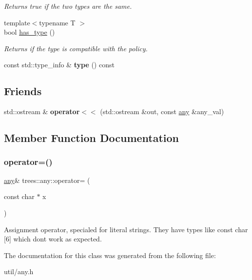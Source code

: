 \begin{DoxyCompactItemize}
\begin{DoxyCompactList}\small\item\em Returns true if the two types are the same. \end{DoxyCompactList}\item 
\mbox{\label{classtrees_1_1any_af176250c5b4a965705c28b3fe4d150ad}} 
{\footnotesize template$<$typename T $>$ }\\bool \hyperlink{classtrees_1_1any_af176250c5b4a965705c28b3fe4d150ad}{has\+\_\+type} ()
\begin{DoxyCompactList}\small\item\em Returns if the type is compatible with the policy. \end{DoxyCompactList}\item 
\mbox{\label{classtrees_1_1any_a12c9cf25286af6afcb4891d8bbd5b2fa}} 
const std\+::type\+\_\+info \& {\bfseries type} () const
\end{DoxyCompactItemize}
\subsection*{Friends}
\begin{DoxyCompactItemize}
\item 
\mbox{\label{classtrees_1_1any_a2987b17b8a128cbefb105ed12f5b8f92}} 
std\+::ostream \& {\bfseries operator$<$$<$} (std\+::ostream \&out, const \hyperlink{classtrees_1_1any}{any} \&any\+\_\+val)
\end{DoxyCompactItemize}


\subsection{Member Function Documentation}
\mbox{\label{classtrees_1_1any_a0368d90cf359207445c6cec185933ea1}} 
\subsubsection{\texorpdfstring{operator=()}{operator=()}}
{\footnotesize\ttfamily \hyperlink{classtrees_1_1any}{any}\& trees\+::any\+::operator= (\begin{DoxyParamCaption}\item[{const char $\ast$}]{x }\end{DoxyParamCaption})\hspace{0.3cm}{\ttfamily [inline]}}

Assignment operator, specialed for literal strings. They have types like const char \mbox{[}6\mbox{]} which don\textquotesingle{}t work as expected. 

The documentation for this class was generated from the following file\+:\begin{DoxyCompactItemize}
\item 
util/any.\+h\end{DoxyCompactItemize}
